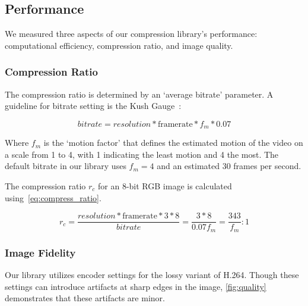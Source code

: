\documentclass{vgtc}                          %
\begin{document}

\subsection{Performance}

We measured three aspects of our compression library's performance:
computational efficiency, compression ratio, and image quality.

\subsubsection{Compression Ratio}



The compression ratio is determined by an `average bitrate' parameter.
A guideline for bitrate setting is the Kush
Gauge~\cite{iszaidyinvestigation}:

\begin{equation}
\label{eq:bitrate}
 bitrate = resolution * \text{framerate} * f_m * 0.07 
\end{equation}

Where \(f_m\) is the `motion factor' that defines the estimated motion
of the video on a scale from 1 to 4, with 1 indicating the least motion
and 4 the most. The default bitrate in our library uses \(f_m=4\)
and an estimated 30 frames per second.

The compression ratio \(r_c\) for an 8-bit RGB image is calculated
using~\cref{eq:compress_ratio}.

\begin{equation}
 \label{eq:compress_ratio}
 r_c = \frac{ resolution * \text{framerate} * 3 * 8}{ bitrate} = \frac{3*8}{0.07f_m} = \frac{343}{f_m} : 1
\end{equation}

\subsubsection{Image Fidelity}

Our library utilizes encoder settings for the lossy variant of
H.264. Though these settings can introduce artifacts at sharp edges in
the image, \cref{fig:quality} demonstrates that these artifacts are minor.
\end{document}
